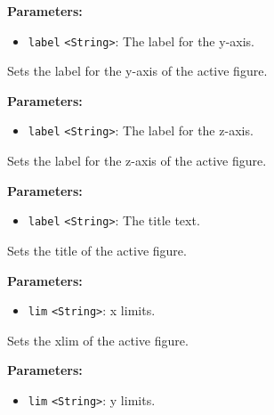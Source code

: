 \documentclass[12pt,a4paper]{article}
\begin{document}
\noindent \textbf{Parameters:}
\begin{itemize}
  \item \texttt{label} \texttt{<String>}: The label for the y-axis.
\end{itemize}

\noindent Sets the label for the y-axis of the active figure.

\vspace{5mm}
\noindent {}


\noindent \textbf{Parameters:}
\begin{itemize}
  \item \texttt{label} \texttt{<String>}: The label for the z-axis.
\end{itemize}

\noindent Sets the label for the z-axis of the active figure.

\vspace{5mm}
\noindent {}


\noindent \textbf{Parameters:}
\begin{itemize}
  \item \texttt{label} \texttt{<String>}: The title text.
\end{itemize}

\noindent Sets the title of the active figure.

\vspace{5mm}
\noindent {}


\noindent \textbf{Parameters:}
\begin{itemize}
  \item \texttt{lim} \texttt{<String>}: x limits.
\end{itemize}

\noindent Sets the xlim of the active figure.

\vspace{5mm}
\noindent {}


\noindent \textbf{Parameters:}
\begin{itemize}
  \item \texttt{lim} \texttt{<String>}: y limits.
\end{itemize}
\end{document}
